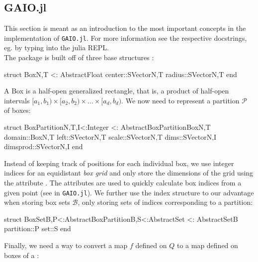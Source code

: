 \subsection{GAIO.jl}

This section is meant as an introduction to the most important concepts in the implementation of 
\texttt{GAIO.jl}. For more information see the respective docstrings, eg. by typing 
 into the julia REPL.\\

The package is built off of three base structures :

\begin{jllisting}[language=julia, style=jlcodestyle]
    struct Box{N,T <: AbstractFloat}
        center::SVector{N,T}
        radius::SVector{N,T}
    end
\end{jllisting}

A Box is a half-open generalized rectangle, that is, a product of half-open intervals
$[a_1, b_1) \times [a_2, b_2) \times \ldots \times [a_d, b_d)$. We now need to represent 
a partition $\mathcal{P}$ of boxes:

\begin{jllisting}[language=julia, style=jlcodestyle]
    struct BoxPartition{N,T,I<:Integer} <: AbstractBoxPartition{Box{N,T}}
        domain::Box{N,T}
        left::SVector{N,T}
        scale::SVector{N,T}
        dims::SVector{N,I}
        dimsprod::SVector{N,I}
    end
\end{jllisting}

Instead of keeping track of positions for each individual box, we use integer indices 
for an equidistant \emph{box grid} and only store the dimensions of the grid using 
the attribute . The attributes  are used to 
quickly calculate box indices from a given point (see  
in \texttt{GAIO.jl}). We further use the index structure to our advantage when storing 
box sets $\mathcal{B}$, only storing sets of indices corresponding to a partition:

\begin{jllisting}[language=julia, style=jlcodestyle]
    struct BoxSet{B,P<:AbstractBoxPartition{B},S<:AbstractSet} <: AbstractSet{B}
        partition::P
        set::S
    end
\end{jllisting}

Finally, we need a way to convert a map $f$ defined on $Q$ to a map  defined on 
boxes of a :

